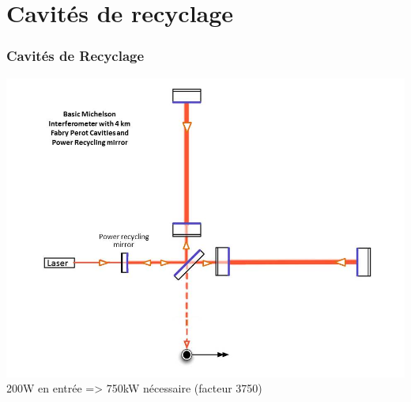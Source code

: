 \documentclass{beamer}
\begin{document}
\section{Cavités de recyclage}
\begin{frame}
	\frametitle{Cavités de Recyclage}
	\includegraphics[scale=0.3]{Docs/recycling_mirrors.png}\\
	200W en entrée => 750kW nécessaire (facteur 3750)
\end{frame}
\end{document}
